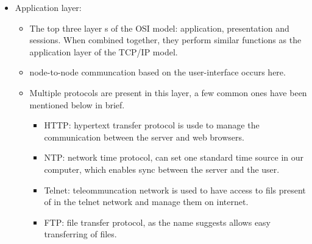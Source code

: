 \begin{itemize}
    \item Application layer:
        \begin{itemize}
            \item The top three layer s of the OSI model: application, presentation and sessions. When combined together, they perform similar functions as the application layer of the TCP/IP model.
            \item node-to-node communcation based on the user-interface occurs here.
            \item Multiple protocols are present in this layer, a few common ones have been mentioned below in brief.
                \begin{itemize}
                    \item HTTP: hypertext transfer protocol is usde to manage the communication between the server and web browsers.
                    \item NTP: network time protocol, can set one standard time source in our computer, which enables sync between the server and the user.
                    \item Telnet: teleommuncation network is used to have access to fils present of in the telnet network and manage them on internet.
                    \item FTP: file transfer protocol, as the name suggests allows easy transferring of files.
                \end{itemize}
        \end{itemize}
\end{itemize}